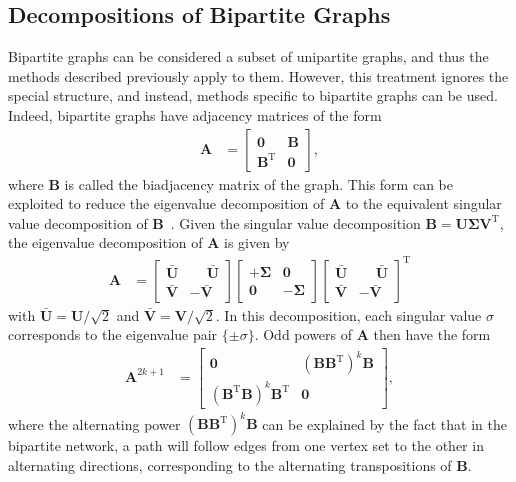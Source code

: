 \documentclass{article}
\begin{document}
\subsection{Decompositions of Bipartite Graphs}
Bipartite graphs can be considered a subset of unipartite graphs, and
thus the methods described previously apply to them.  However, this
treatment ignores the special structure, and instead, methods specific
to bipartite graphs can be used.  Indeed, bipartite graphs have
adjacency matrices of the form  
\begin{align}
  \mathbf A &= \left[ \begin{array}{cc} \mathbf 0^{\phantom {\mathrm T}}
      & \mathbf B \\ \mathbf 
      B^{\mathrm T} & \mathbf 0 \end{array} \right], 
\end{align}
where $\mathbf B$ is called the biadjacency matrix of the graph.  This form can be
exploited to reduce the eigenvalue decomposition of $\mathbf A$ to the equivalent
singular value decomposition of $\mathbf B$~\citep{b614}. 
Given the singular value
decomposition $\mathbf B = \mathbf U \mathbf \Sigma \mathbf
V^{\mathrm T}$, the eigenvalue decomposition of $\mathbf A$ is given by
\begin{align}
  \mathbf A &=
  \left[ \begin{array}{cc} \mathbf {\bar U} & {\phantom -}\mathbf
      {\bar U} \\ \mathbf {\bar V} & -\mathbf {\bar V} \end{array} \right] 
  \left[ \begin{array}{cc} +\mathbf \Sigma & \mathbf 0 \\ \mathbf 0 &
      -\mathbf \Sigma \end{array} \right] 
  \left[ \begin{array}{cc} \mathbf {\bar U} & {\phantom -}\mathbf
      {\bar U} \\ \mathbf {\bar V} & -\mathbf {\bar V} \end{array}
    \right]^{\mathrm T}  
\end{align}
with $\mathbf {\bar U} =\mathbf U/\sqrt 2$ and $\mathbf {\bar V} =
\mathbf V/\sqrt 2$.
In this decomposition, 
each singular value $\sigma$ corresponds to the eigenvalue pair $\{\pm
\sigma\}$.  
Odd powers of $\mathbf A$ then have the form
\begin{align*}
  \mathbf A^{2k+1} &= \left[ \begin{array}{cc} 
      \mathbf 0 & (\mathbf B \mathbf B^{\mathrm T})^k \mathbf B \\
      (\mathbf B^{\mathrm T} \mathbf B)^k \mathbf B^{\mathrm T} &
      \mathbf 0 
    \end{array} \right],
\end{align*}
where the alternating power $(\mathbf B \mathbf B^{\mathrm T})^k \mathbf
B$ can be explained by the fact that in the bipartite network, a path
will follow edges from one vertex set to the other in alternating
directions, corresponding to the alternating transpositions of $\mathbf
B$. 
\end{document}

